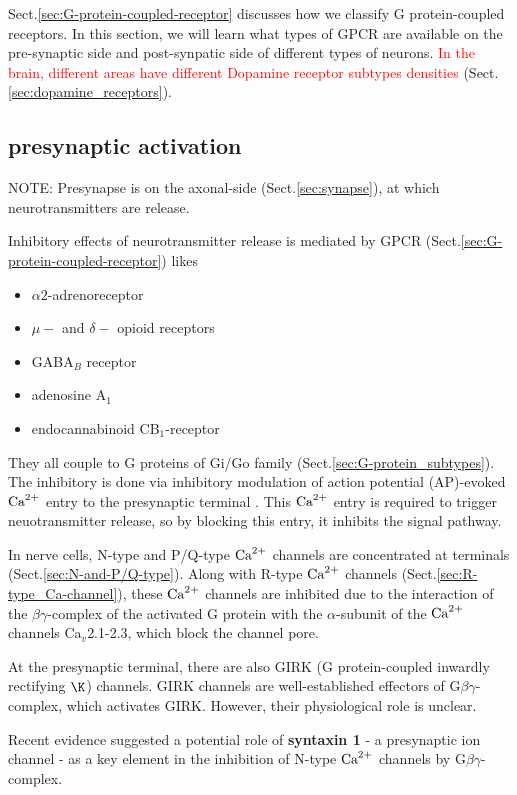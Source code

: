 Sect.\ref{sec:G-protein-coupled-receptor} discusses how we classify G
protein-coupled receptors. In this section, we will learn what types of GPCR are
available on the pre-synaptic side and post-synpatic side of different types of
neurons. \textcolor{red}{In the brain, different areas have different Dopamine receptor
subtypes densities} (Sect.\ref{sec:dopamine_receptors}).


\citep{Wettschureck2005}

\subsection{presynaptic activation}

NOTE: Presynapse is on the axonal-side (Sect.\ref{sec:synapse}), at which
neurotransmitters are release.

Inhibitory effects of neurotransmitter release is mediated by GPCR
(Sect.\ref{sec:G-protein-coupled-receptor}) likes
\begin{itemize}
  \item $\alpha2$-adrenoreceptor
  \item $\mu-$ and $\delta-$ opioid receptors
  \item GABA$_B$ receptor
  \item adenosine A$_1$
  \item endocannabinoid CB$_1$-receptor
\end{itemize}
They all couple to G proteins of Gi/Go family (Sect.\ref{sec:G-protein_subtypes}).
The inhibitory is done via inhibitory modulation of action potential (AP)-evoked
${\text{Ca}^{2+}}$ entry to the presynaptic terminal \citep{augustine1985}. This ${\text{Ca}^{2+}}$ entry
is required to trigger neuotransmitter release, so by blocking this entry, it
inhibits the signal pathway. 

In nerve cells, N-type and P/Q-type ${\text{Ca}^{2+}}$ channels are concentrated at
terminals (Sect.\ref{sec:N-and-P/Q-type}). Along with R-type ${\text{Ca}^{2+}}$ channels
(Sect.\ref{sec:R-type_Ca-channel}), these ${\text{Ca}^{2+}}$ channels are inhibited due to
the interaction of the $\beta\gamma$-complex of the activated G protein with the
$\alpha$-subunit of the ${\text{Ca}^{2+}}$ channels Ca$_v$2.1-2.3, which block the channel
pore.

At the presynaptic terminal, there are also GIRK (G protein-coupled inwardly
rectifying $\K$) channels. GIRK channels are
well-established effectors of G$\beta\gamma$-complex, which activates GIRK.
However, their physiological role is unclear.

Recent evidence suggested a potential role of {\bf syntaxin 1} - a presynaptic
ion channel - as a key element in the inhibition of N-type ${\text{Ca}^{2+}}$ channels by
G$\beta\gamma$-complex.


